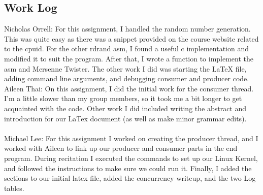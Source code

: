 \documentclass[letterpaper, 10pt, notitlepage]{article}
\begin{document}
\subsection{Work Log}
Nicholas Orrell: For this assignment, I handled the random number generation. This was quite easy as there was a snippet provided on the course website related to the cpuid. For the other rdrand asm, I found a useful c implementation and modified it to suit the program. After that, I wrote a function to implement the asm and Mersenne Twister. The other work I did was starting the LaTeX file, adding command line arguments, and debugging consumer and producer code.
\newline \newline
Aileen Thai: On this assignment, I did the initial work for the consumer thread. I'm a little slower than my group members, so it took me a bit longer to get acquainted with the code. Other work I did included writing the abstract and introduction for our LaTex document (as well as make minor grammar edits).
\\ \\
Michael Lee: For this assignment I worked on creating the producer thread, and I worked with Aileen to link up our producer and consumer parts in the end program. During recitation I executed the commands to set up our Linux Kernel, and followed the instructions to make sure we could run it. Finally, I added the sections to our initial latex file, added the concurrency writeup, and the two Log tables.
\end{document}
